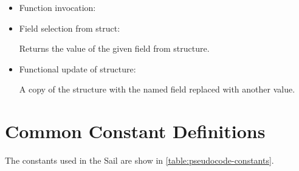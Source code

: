 \begin{itemize}
\item Function invocation:


\item Field selection from struct:


Returns the value of the given field from structure.

\item Functional update of structure:


A copy of the structure with the named field replaced with another value.

\end{itemize}

%

\section{Common Constant Definitions}

The constants used in the Sail are show in \cref{table:pseudocode-constants}.

